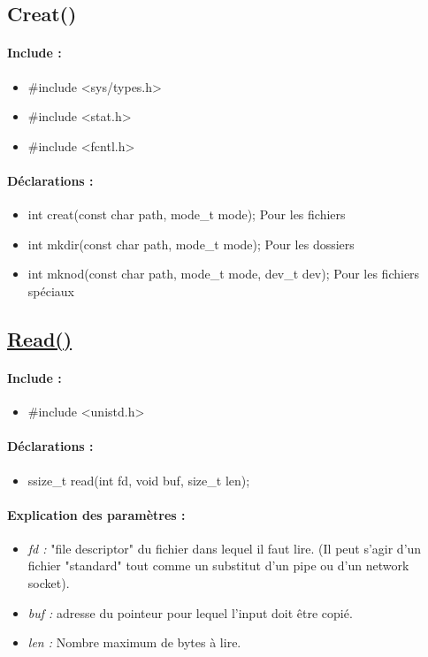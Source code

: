 \documentclass{article}[12pt]
\begin{document}
\subsection{Creat()}
\paragraph{Include : }
\begin{itemize}
	\item \#include <sys/types.h>
	\item \#include <stat.h>
	\item \#include <fcntl.h>
\end{itemize}
\paragraph{Déclarations : }
\begin{itemize}
	\item int creat(const char \* path, mode\_t mode); Pour les fichiers
	\item int mkdir(const char \* path, mode\_t mode); Pour les dossiers
	\item int mknod(const char \* path, mode\_t mode, dev\_t dev); Pour les fichiers spéciaux
\end{itemize}
\subsection{\href{http://jp.barralis.com/linux-man/man2/read.2.php}{Read()}}
\paragraph{Include : }
\begin{itemize}
	\item \#include <unistd.h>
\end{itemize}
\paragraph{Déclarations : }
\begin{itemize}
	\item ssize\_t read(int fd, void \* buf, size\_t len);
\end{itemize}
\paragraph{Explication des paramètres : }
\begin{itemize}
	\item \emph{fd : } "file descriptor" du fichier dans lequel il faut lire. (Il peut s'agir d'un fichier "standard" tout comme un substitut d'un pipe ou d'un network socket).
	\item \emph{buf : } adresse du pointeur pour lequel l'input doit être copié.
	\item \emph{len : } Nombre maximum de bytes à lire.
\end{itemize}
\end{document}
